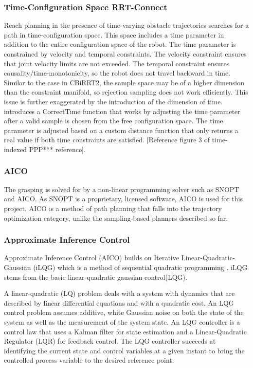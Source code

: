 \documentclass[12pt]{article}
\begin{document}
        \subsubsection{Time-Configuration Space RRT-Connect}
            Reach planning in the presence of time-varying obstacle trajectories searches for a path in time-configuration space. This space includes a time parameter in addition to the entire configuration space of the robot. The time parameter is constrained by velocity and temporal constraints. The velocity constraint ensures that joint velocity limits are not exceeded. The temporal constraint ensures causality/time-monotonicity, so the robot does not travel backward in time. Similar to the case in CBiRRT2, the sample space may be of a higher dimension than the constraint manifold, so rejection sampling does not work efficiently. This issue is further exaggerated by the introduction of the dimension of time. \cite{yang_planning_2018} introduces a CorrectTime function that works by adjusting the time parameter after a valid sample is chosen from the free configuration space. The time parameter is adjusted based on a custom distance function that only returns a real value if both time constraints are satisfied. [Reference figure 3 of time-indexed PPP*** reference].

        \subsubsection{AICO}
            The grasping is solved for by a non-linear programming solver such as SNOPT and AICO. As SNOPT is a proprietary, licensed software, AICO is used for this project. AICO is a method of path planning that falls into the trajectory optimization category, unlike the sampling-based planners described so far.

        \subsubsection{Approximate Inference Control}
            Approximate Inference Control (AICO) \cite{toussaint_robot_2009} builds on Iterative Linear-Quadratic-Gaussian (iLQG) which is a method of sequential quadratic programming \cite{todorov_generalized_2005}. iLQG stems from the basic linear-quadratic gaussian control(LQG).

            \par A linear-quadratic (LQ) problem deals with a system with dynamics that are described by linear differential equations and with a quadratic cost. An LQG control problem assumes additive, white Gaussian noise on both the state of the system as well as the measurement of the system state. An LQG controller is a control law that uses a Kalman filter for state estimation and a Linear-Quadratic Regulator (LQR) for feedback control. The LQG controller succeeds at identifying the current state and control variables at a given instant to bring the controlled process variable to the desired reference point.
\end{document}
